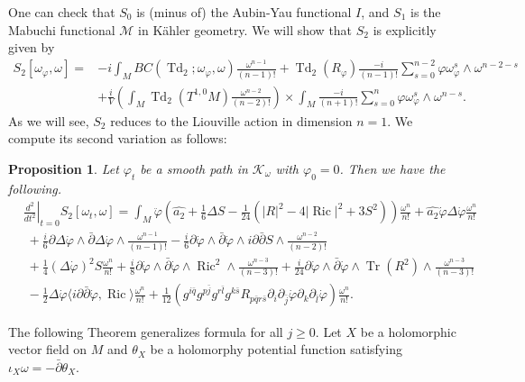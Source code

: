 \documentclass[12pt,reqno,a4paper]{amsart}
\numberwithin{equation}{section}
\def\p{\partial}
\def\bp{\bar\partial}
\DeclareMathOperator{\Td}{Td}
\DeclareMathOperator{\Tr}{Tr}
\DeclareMathOperator{\ric}{Ric}
\newtheorem{mainprop}{{\sc Proposition}}
\theoremstyle{remark}
\theoremstyle{dotless}
\begin{document}
One can check that $S_0$ is (minus of) the Aubin-Yau functional $I$, and $S_1$ is the Mabuchi functional $\mathcal{M}$ in K\"ahler geometry. We will show that $S_2$ is explicitly given by
\begin{align*}
S_2[\omega_\varphi,\omega]=&-i\int_M BC(\Td_2;\omega_\varphi,\omega)\frac{\omega^{n-1}}{(n-1)!}+\Td_{2}(R_\varphi)\frac{-i}{(n-1)!}\sum^{n-2}_{s=0}\varphi \omega_{\varphi}^s\wedge \omega^{n-2-s}\\
&+\frac{i}{V}\left(\int_M \Td_2(T^{1,0}M)\frac{\omega^{n-2}}{(n-2)!}\right)\times\int_M \frac{-i}{(n+1)!}\sum^{n}_{s=0}\varphi \omega_{\varphi}^s\wedge \omega^{n-s}.
\end{align*}
As we will see, $S_2$ reduces to the Liouville action in dimension $n=1$. We compute its second variation as follows:

\begin{mainprop}\label{m2}
Let $\varphi_t$ be a smooth path in $\mathcal{K}_\omega$ with $\varphi_0=0$. Then we have the following.
\begin{align*}
& \left.\frac{d^2}{dt^2}\right|_{t=0}S_2[\omega_t,\omega]=\int_M \ddot{\varphi}\left(\widehat{a_2}+\frac{1}{6}\Delta S-\frac{1}{24}\left(|R|^2-4|\ric|^2+3S^2\right) \right) \frac{\omega^n}{n!} +\widehat{a_2}\dot{\varphi}\Delta\dot{\varphi}\frac{\omega^n}{n!}  \\
&\;+ \frac{i}{6}\p\Delta\dot{\varphi}\wedge\bp\Delta\dot{\varphi}\wedge\frac{\omega^{n-1}}{(n-1)!}-\frac{i}{6}\p\dot{\varphi}\wedge\bp\dot{\varphi}\wedge i\p\bp S\wedge \frac{\omega^{n-2}}{(n-2)!}\\
&\;+\frac{1}{4}(\Delta\dot{\varphi})^2S\frac{\omega^{n}}{n!}+\frac{i}{8}\p\dot{\varphi}\wedge\bp\dot{\varphi}\wedge\ric^2\wedge\frac{\omega^{n-3}}{(n-3)!}+\frac{i}{24}\p\dot{\varphi}\wedge\bp\dot{\varphi}\wedge\Tr(R^2)\wedge\frac{\omega^{n-3}}{(n-3)!} \\
&\;-\frac{1}{2}\Delta\dot{\varphi}\langle i\p\bp\dot{\varphi},\ric \rangle \frac{\omega^{n}}{n!} +\frac{1}{12}\left( g^{i\bar{q}}g^{p\bar{j}}g^{r\bar{l}}g^{k\bar{s}} R_{p\bar{q}r\bar{s}} \p_i\p_{\bar{j}}\dot{\varphi} \p_k\p_{\bar{l}}\dot{\varphi} \right)\frac{\omega^{n}}{n!}. 
\end{align*}
\end{mainprop}

The following Theorem generalizes formula \cite[(4.4)]{lu2004k} for all $j\geq 0$. Let $X$ be a holomorphic vector field on $M$ and $\theta_X$ be a holomorphy potential function satisfying $\iota_X \omega = -\bp \theta_X$.
\end{document}
